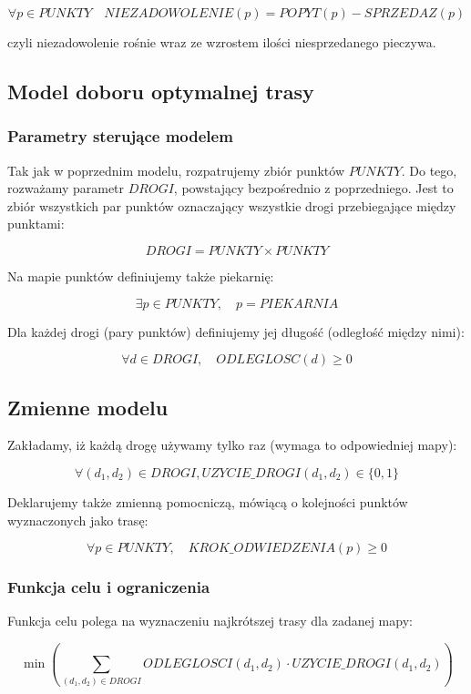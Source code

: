 \documentclass[]{article}
\begin{document}
\[
\forall p \in PUNKTY \quad NIEZADOWOLENIE(p) = POPYT(p) - SPRZEDAZ(p)
\]

czyli niezadowolenie rośnie wraz ze wzrostem ilości niesprzedanego pieczywa.

\subsection{Model doboru optymalnej trasy}

\subsubsection{Parametry sterujące modelem}

Tak jak w poprzednim modelu, rozpatrujemy zbiór punktów $PUNKTY$. Do tego, rozważamy parametr $DROGI$, powstający bezpośrednio z poprzedniego. Jest to zbiór wszystkich par punktów oznaczający wszystkie drogi przebiegające między punktami:

\[
DROGI = PUNKTY \times PUNKTY
\]

Na mapie punktów definiujemy także piekarnię:

\[
\exists p \in PUNKTY, \quad p = PIEKARNIA
\]

Dla każdej drogi (pary punktów) definiujemy jej długość (odległość między nimi):

\[
\forall d \in DROGI, \quad ODLEGLOSC(d) \geq 0
\]

\subsection{Zmienne modelu}

Zakładamy, iż każdą drogę używamy tylko raz (wymaga to odpowiedniej mapy):

\[
	\forall (d_1, d_2) \in DROGI, UZYCIE\_DROGI(d_1, d_2) \in \{0, 1\}
\]

Deklarujemy także zmienną pomocniczą, mówiącą o kolejności punktów wyznaczonych jako trasę:

\[
	\forall p \in PUNKTY, \quad KROK\_ODWIEDZENIA(p) \geq 0
\]

\subsubsection{Funkcja celu i ograniczenia}

Funkcja celu polega na wyznaczeniu najkrótszej trasy dla zadanej mapy:

\[
	\min \left( \sum_{(d_1, d_2) \in DROGI} ODLEGLOSCI(d_1, d_2) \cdot UZYCIE\_DROGI(d_1, d_2) \right)
\]
\end{document}
